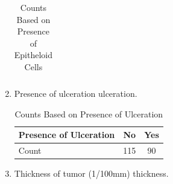 \begin{enumerate}
\begin{table}[h!]
\begin{tabular}{|l|c|c|}
        \hline
    \end{tabular}
    \caption{Counts Based on Presence of Epitheloid Cells}
    \label{tab:epitheloid_cells}
\end{table}
\item Presence of ulceration ulceration. \newline
\begin{table}[h!]
    \centering
    \begin{tabular}{|l|c|c|}
        \hline
        Presence of Ulceration & No & Yes \\
        \hline
        Count & 115 & 90 \\
        \hline
    \end{tabular}
    \caption{Counts Based on Presence of Ulceration}
    \label{tab:ulceration}
\end{table}
\newpage
\item Thickness of tumor (1/100mm) thickness.


\end{enumerate}
